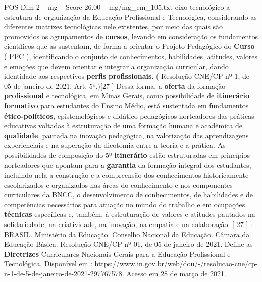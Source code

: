 \begin{textsample}{POS Dim 2 – mg – Score 26.00 – mg/mg\_em\_105.txt}
eixo tecnológico a estrutura de organização da Educação Profissional e Tecnológica, considerando as diferentes matrizes tecnológicas nele existentes, por meio das quais são promovidos os agrupamentos de \textbf{cursos}, levando em consideração os fundamentos científicos que as sustentam, de forma a orientar o Projeto Pedagógico do \textbf{Curso} ( PPC ), identificando o conjunto de conhecimentos, habilidades, atitudes, valores e emoções que devem orientar e integrar a organização curricular, dando identidade aos respectivos \textbf{perfis} \textbf{profissionais}. ( Resolução CNE/CP nº 1, de 05 de janeiro de 2021, Art. 5º.)[27 ] Dessa forma, a \textbf{oferta} da formação \textbf{profissional} e tecnológica, em Minas Gerais, como possibilidade de \textbf{itinerário} \textbf{formativo} para estudantes do Ensino Médio, está sustentada em fundamentos \textbf{ético-políticos}, epistemológicos e didático-pedagógicos norteadores das práticas educativas voltadas à estruturação de uma formação humana e acadêmica de \textbf{qualidade}, pautada na inovação pedagógica, na valorização das aprendizagens experienciais e na superação da dicotomia entre a teoria e a prática.
As possibilidades de composição do 5º \textbf{itinerário} estão estruturadas em princípios norteadores que apontam para a \textbf{garantia} da formação integral dos estudantes, incluindo nela a construção e a compreensão dos conhecimentos historicamente escolarizados e organizados nas áreas do conhecimento e nos componentes curriculares da BNCC, o desenvolvimento de conhecimentos, de habilidades e de competências necessários para atuação no mundo do trabalho e em ocupações \textbf{técnicas} específicas e, também, à estruturação de valores e atitudes pautados na solidariedade, na criatividade, na inovação, na empatia e na colaboração. [ 27 ] : BRASIL.
Ministério da Educação.
Conselho Nacional da Educação.
Câmara da Educação Básica.
Resolução CNE/CP nº 01, de 05 de janeiro de 2021.
Define as \textbf{Diretrizes} Curriculares Nacionais Gerais para a Educação Profissional e Tecnológica.
Disponível em : https://www.in.gov.br/web/dou/-/resolucao-cne/cp-n-1-de-5-de-janeiro-de-2021-297767578.
Acesso em 28 de março de 2021.

\end{textsample}
